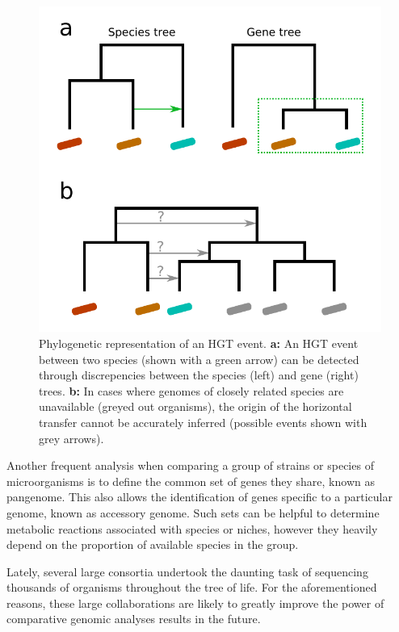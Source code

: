 \begin{figure}[htb]
    \includegraphics[width=\textwidth]{Parts/Part01/gfx/phylo_hgt.pdf}
    \caption{Phylogenetic representation of an HGT event. \textbf{a:} An HGT event between two species (shown with a green arrow) can be detected through discrepencies between the species (left) and gene (right) trees. \textbf{b:} In cases where genomes of closely related species are unavailable (greyed out organisms), the origin of the horizontal transfer cannot be accurately inferred (possible events shown with grey arrows).}
    \label{fig:01-03:phylo-hgt}
\end{figure}

Another frequent analysis when comparing a group of strains or species of microorganisms is to define the common set of genes they share, known as pangenome. This also allows the identification of genes specific to a particular genome, known as accessory genome. Such sets can be helpful to determine metabolic reactions associated with species or niches, however they heavily depend on the proportion of available species in the group.

Lately, several large consortia \citep{genome10kcommunityofscientistsGenome10KProposal2009,poelchauI5kWorkspaceNAL2015,DarwinTreeLife} undertook the daunting task of sequencing thousands of organisms throughout the tree of life. For the aforementioned reasons, these large collaborations are likely to greatly improve the power of comparative genomic analyses results in the future.

